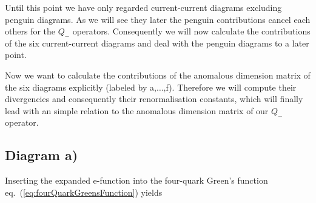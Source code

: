 	Until this point we have only regarded current-current diagrams excluding penguin diagrams. As we will see they later the penguin contributions cancel each others for the $Q_-$ operators. Consequently we will now calculate the contributions of the six current-current diagrams and deal with the penguin diagrams to a later point. \par
	Now we want to calculate the contributions of the anomalous dimension matrix of the six diagrams explicitly (labeled by a,$\ldots$,f). Therefore we will compute their divergencies and consequently their renormalisation constants, which will finally lead with an simple relation to the anomalous dimension matrix of our $Q_-$ operator. 
	\subsection*{Diagram a)}
	Inserting the expanded e-function into the four-quark Green's function eq.~(\ref{eq:fourQuarkGreensFunction}) yields

